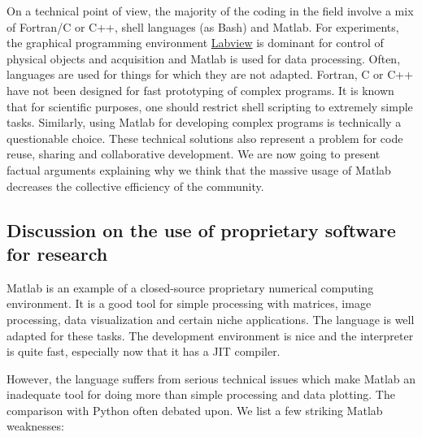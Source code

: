 On a technical point of view, the majority of the coding in the field involve a
mix of Fortran/C or C++, shell languages (as Bash) and Matlab. For experiments,
the graphical programming environment
\href{http://www.ni.com/en-us/shop/labview.html}{Labview} is dominant for
control of physical objects and acquisition and Matlab is used for data
processing.
%
Often, languages are used for things for which they are not adapted.
%
Fortran, C or C++ have not been designed for fast prototyping of complex
programs.
%
It is known that for scientific purposes, one should restrict shell scripting
to extremely simple tasks.
%
Similarly, using Matlab for developing complex programs is technically a
questionable choice.
%
These technical solutions also represent a problem for code reuse, sharing and
collaborative development.
%
We are now going to present factual arguments explaining why we think that the
massive usage of Matlab decreases the collective efficiency of the community.

\subsection{Discussion on the use of proprietary software for research}


Matlab is an example of a closed-source proprietary numerical computing
environment.
%
It is a good tool for simple processing with matrices, image processing, data
visualization and certain niche applications. The language is well adapted for
these tasks. The development environment is nice and the interpreter is quite
fast, especially now that it has a JIT compiler.

However, the language suffers from serious technical issues which make Matlab
an inadequate tool
for doing more than simple processing and data plotting. The comparison with
Python often debated upon. We list a few striking Matlab weaknesses:

